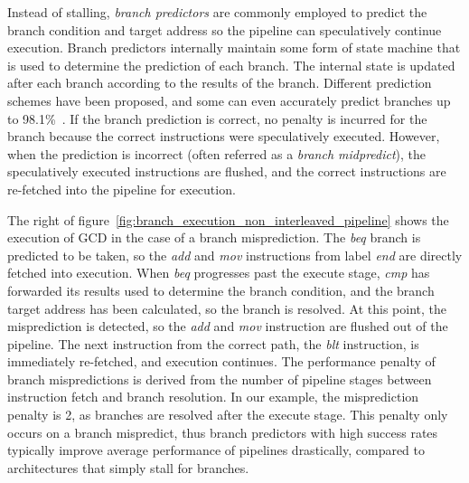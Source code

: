 Instead of stalling, \emph{branch predictors} are commonly employed to predict the branch condition and target address so the pipeline can speculatively continue execution. 
Branch predictors internally maintain some form of state machine that is used to determine the prediction of each branch.  
The internal state is updated after each branch according to the results of the branch. 
Different prediction schemes have been proposed, and some can even accurately predict branches up to 98.1\%~\cite{Mcfarling_Branch_predict}.  
If the branch prediction is correct, no penalty is incurred for the branch because the correct instructions were speculatively executed.  
However, when the prediction is incorrect (often referred as a \emph{branch midpredict}), the speculatively executed instructions are flushed, and the correct instructions are re-fetched into the pipeline for execution.

The right of figure~\ref{fig:branch_execution_non_interleaved_pipeline} shows the execution of GCD in the case of a branch misprediction.
The \emph{beq} branch is predicted to be taken, so the \emph{add} and \emph{mov} instructions from label \emph{end} are directly fetched into execution. 
When \emph{beq} progresses past the execute stage, \emph{cmp} has forwarded its results used to determine the branch condition, and the branch target address has been calculated, so the branch is resolved.
At this point, the misprediction is detected, so the \emph{add} and \emph{mov} instruction are flushed out of the pipeline. 
The next instruction from the correct path, the \emph{blt} instruction, is immediately re-fetched, and execution continues.
The performance penalty of branch mispredictions is derived from the number of pipeline stages between instruction fetch and branch resolution.  
In our example, the misprediction penalty is 2, as branches are resolved after the execute stage.
This penalty only occurs on a branch mispredict, thus branch predictors with high success rates typically improve average performance of pipelines drastically, compared to architectures that simply stall for branches.

